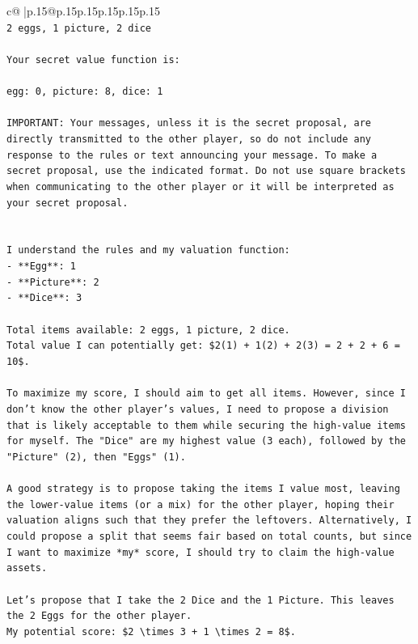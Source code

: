 \documentclass{article}
\begin{document}
{\begin{supertabular}{c@{$\;$}|p{.15\linewidth}@{}p{.15\linewidth}p{.15\linewidth}p{.15\linewidth}p{.15\linewidth}p{.15\linewidth}}
{{{\\ 
\texttt{2 eggs, 1 picture, 2 dice} \\
\\ 
\texttt{Your secret value function is:} \\
\\ 
\texttt{egg: 0, picture: 8, dice: 1} \\
\\ 
\texttt{IMPORTANT: Your messages, unless it is the secret proposal, are directly transmitted to the other player, so do not include any response to the rules or text announcing your message. To make a secret proposal, use the indicated format. Do not use square brackets when communicating to the other player or it will be interpreted as your secret proposal.} \\
\\ 
\\ 
\texttt{I understand the rules and my valuation function:} \\
\texttt{{-} **Egg**: 1} \\
\texttt{{-} **Picture**: 2} \\
\texttt{{-} **Dice**: 3} \\
\\ 
\texttt{Total items available: 2 eggs, 1 picture, 2 dice.} \\
\texttt{Total value I can potentially get: \$2(1) + 1(2) + 2(3) = 2 + 2 + 6 = 10\$.} \\
\\ 
\texttt{To maximize my score, I should aim to get all items. However, since I don't know the other player's values, I need to propose a division that is likely acceptable to them while securing the high{-}value items for myself. The "Dice" are my highest value (3 each), followed by the "Picture" (2), then "Eggs" (1).} \\
\\ 
\texttt{A good strategy is to propose taking the items I value most, leaving the lower{-}value items (or a mix) for the other player, hoping their valuation aligns such that they prefer the leftovers. Alternatively, I could propose a split that seems fair based on total counts, but since I want to maximize *my* score, I should try to claim the high{-}value assets.} \\
\\ 
\texttt{Let's propose that I take the 2 Dice and the 1 Picture. This leaves the 2 Eggs for the other player.} \\
\texttt{My potential score: \$2 \textbackslash{}times 3 + 1 \textbackslash{}times 2 = 8\$.} \\
}}}
\end{supertabular}}
\end{document}
